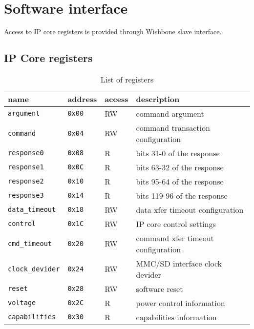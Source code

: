 \section{Software interface}
\label{sec:sw_if}

    Access to IP core registers is provided through Wishbone slave interface. 
    
    \subsection{IP Core registers}
    \label{sec:regs}

    \begin{table}[H]
    \caption{List of registers}
        \begin{tabular}{l|l|l|l}
                \rowcolor[gray]{0.7} name & address & access & description \\ \hline \hline
                \texttt{argument} & \texttt{0x00} & RW & command argument \\ \hline
                \texttt{command} & \texttt{0x04} & RW & command transaction configuration \\ \hline
                \texttt{response0} & \texttt{0x08} & R & bits 31-0 of the response \\ \hline
                \texttt{response1} & \texttt{0x0C} & R & bits 63-32 of the response \\ \hline
                \texttt{response2} & \texttt{0x10} & R & bits 95-64 of the response \\ \hline
                \texttt{response3} & \texttt{0x14} & R & bits 119-96 of the response \\ \hline
                \texttt{data\_timeout} & \texttt{0x18} & RW & data xfer timeout configuration \\ \hline
                \texttt{control} & \texttt{0x1C} & RW & IP core control settings \\ \hline
                \texttt{cmd\_timeout} & \texttt{0x20} & RW & command xfer timeout configuration \\ \hline
                \texttt{clock\_devider} & \texttt{0x24} & RW & MMC/SD interface clock devider \\ \hline
                \texttt{reset} & \texttt{0x28} & RW & software reset \\ \hline
                \texttt{voltage} & \texttt{0x2C} & R & power control information \\ \hline
                \texttt{capabilities} & \texttt{0x30} & R & capabilities information \\ \hline

\end{tabular}
\end{table}
